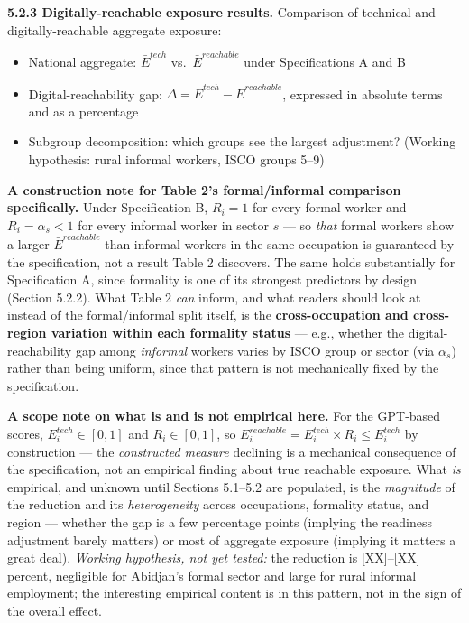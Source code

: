 \documentclass[
  11pt,
]{article}
\providecommand{\tightlist}{%
  \setlength{\itemsep}{0pt}\setlength{\parskip}{0pt}}
\begin{document}
\textbf{5.2.3 Digitally-reachable exposure results.} Comparison of
technical and digitally-reachable aggregate exposure:

\begin{itemize}
\tightlist
\item
  National aggregate: \(\bar{E}^{tech}\) vs.~\(\bar{E}^{reachable}\)
  under Specifications A and B
\item
  Digital-reachability gap:
  \(\Delta = \bar{E}^{tech} - \bar{E}^{reachable}\), expressed in
  absolute terms and as a percentage
\item
  Subgroup decomposition: which groups see the largest adjustment?
  (Working hypothesis: rural informal workers, ISCO groups 5--9)
\end{itemize}

\textbf{A construction note for Table 2's formal/informal comparison
specifically.} Under Specification B, \(R_i = 1\) for every formal
worker and \(R_i = \alpha_s < 1\) for every informal worker in sector
\(s\) --- so \emph{that} formal workers show a larger
\(\bar{E}^{reachable}\) than informal workers in the same occupation is
guaranteed by the specification, not a result Table 2 discovers. The
same holds substantially for Specification A, since formality is one of
its strongest predictors by design (Section 5.2.2). What Table 2
\emph{can} inform, and what readers should look at instead of the
formal/informal split itself, is the \textbf{cross-occupation and
cross-region variation within each formality status} --- e.g., whether
the digital-reachability gap among \emph{informal} workers varies by
ISCO group or sector (via \(\alpha_s\)) rather than being uniform, since
that pattern is not mechanically fixed by the specification.

\textbf{A scope note on what is and is not empirical here.} For the
GPT-based scores, \(E_i^{tech} \in [0, 1]\) and \(R_i \in [0, 1]\), so
\(E_i^{reachable} = E_i^{tech} \times R_i \le E_i^{tech}\) by
construction --- the \emph{constructed measure} declining is a
mechanical consequence of the specification, not an empirical finding
about true reachable exposure. What \emph{is} empirical, and unknown
until Sections 5.1--5.2 are populated, is the \emph{magnitude} of the
reduction and its \emph{heterogeneity} across occupations, formality
status, and region --- whether the gap is a few percentage points
(implying the readiness adjustment barely matters) or most of aggregate
exposure (implying it matters a great deal). \emph{Working hypothesis,
not yet tested:} the reduction is {[}XX{]}--{[}XX{]} percent, negligible
for Abidjan's formal sector and large for rural informal employment; the
interesting empirical content is in this pattern, not in the sign of the
overall effect.
\end{document}
